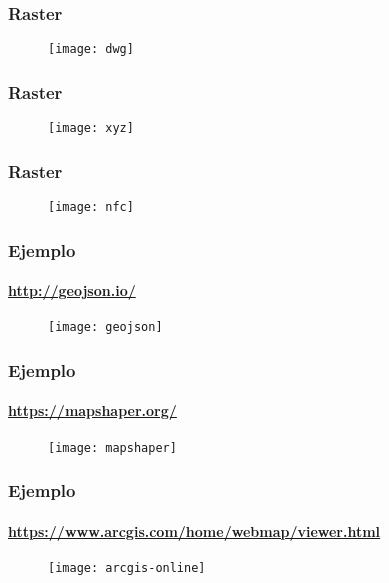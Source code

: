 \documentclass[14pt]{beamer}
\begin{document}
\begin{frame}
\frametitle{Raster}
  \begin{figure}
    \centering
    \texttt{[image: dwg]}
  \end{figure}
\end{frame}
\begin{frame}
\frametitle{Raster}
  \begin{figure}
    \centering
    \texttt{[image: xyz]}
  \end{figure}
\end{frame}
\begin{frame}
\frametitle{Raster}
  \begin{figure}
    \centering
    \texttt{[image: nfc]}
  \end{figure}
\end{frame}
\begin{frame}
\frametitle{Ejemplo}
\framesubtitle{\url{http://geojson.io/}}
  \begin{figure}
    \centering
    \texttt{[image: geojson]}
  \end{figure}
\end{frame}
\begin{frame}
  \frametitle{Ejemplo}
  \framesubtitle{\url{https://mapshaper.org/}}
  \begin{figure}
    \centering
    \texttt{[image: mapshaper]}\\
  \end{figure}
  \end{frame}
\begin{frame}
\frametitle{Ejemplo}
\framesubtitle{\url{https://www.arcgis.com/home/webmap/viewer.html}}
  \begin{figure}
    \centering
    \texttt{[image: arcgis-online]}
  \end{figure}
\end{frame}
\end{document}
